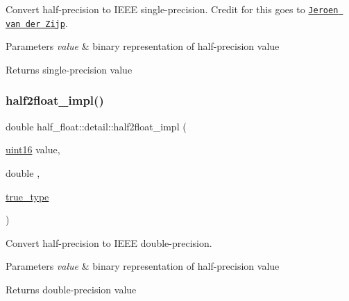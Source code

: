 Convert half-\/precision to I\+E\+EE single-\/precision. Credit for this goes to \href{ftp://ftp.fox-toolkit.org/pub/fasthalffloatconversion.pdf}{\tt Jeroen van der Zijp}. 
\begin{DoxyParams}{Parameters}
{\em value} & binary representation of half-\/precision value \\
\hline
\end{DoxyParams}
\begin{DoxyReturn}{Returns}
single-\/precision value 
\end{DoxyReturn}
\mbox{\label{namespacehalf__float_1_1detail_aaf774221cb784d97cb9fdf0edc1a76f3}} 
\subsubsection{\texorpdfstring{half2float\+\_\+impl()}{half2float\_impl()}\hspace{0.1cm}{\footnotesize\ttfamily [2/3]}}
{\footnotesize\ttfamily double half\+\_\+float\+::detail\+::half2float\+\_\+impl (\begin{DoxyParamCaption}\item[{\hyperlink{namespacehalf__float_1_1detail_a239ec58092b4e4849b444baee1a01088}{uint16}}]{value,  }\item[{double}]{,  }\item[{\hyperlink{namespacehalf__float_1_1detail_a5e245748a3cc20e348dd92383d99d03c}{true\+\_\+type}}]{ }\end{DoxyParamCaption})\hspace{0.3cm}{\ttfamily [inline]}}

Convert half-\/precision to I\+E\+EE double-\/precision. 
\begin{DoxyParams}{Parameters}
{\em value} & binary representation of half-\/precision value \\
\hline
\end{DoxyParams}
\begin{DoxyReturn}{Returns}
double-\/precision value 
\end{DoxyReturn}
\mbox{\label{namespacehalf__float_1_1detail_afe86dfbf3a3bac81cfe88aaec27969c1}} 
